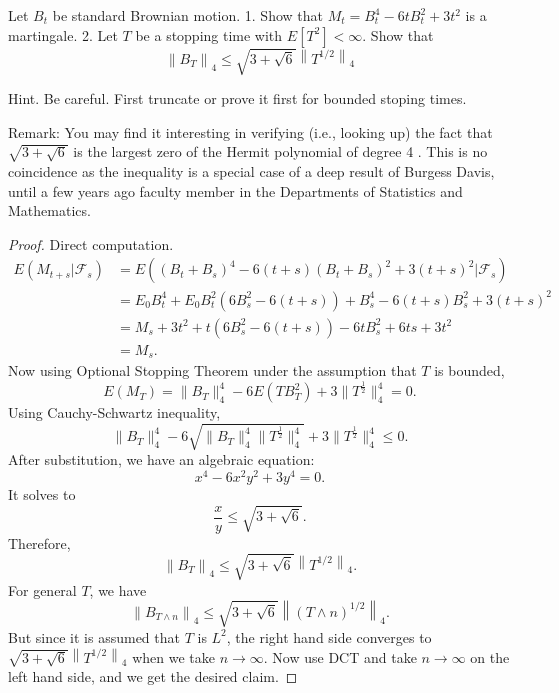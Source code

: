 \begin{problem}
	Let $B_t$ be standard Brownian motion.
1. Show that $M_t=B_t^4-6 t B_t^2+3 t^2$ is a martingale.
2. Let $T$ be a stopping time with $E\left[T^2\right]<\infty$. Show that
\[
\left\|B_T\right\|_4 \leq \sqrt{3+\sqrt{6}}\left\|T^{1 / 2}\right\|_4
\]

Hint. Be careful. First truncate or prove it first for bounded stoping times.

Remark: You may find it interesting in verifying (i.e., looking up) the fact that $\sqrt{3+\sqrt{6}}$ is the largest zero of the Hermit polynomial of degree 4 . This is no coincidence as the inequality is a special case of a deep result of Burgess Davis, until a few years ago faculty member in the Departments of Statistics and Mathematics.
\end{problem}
\begin{proof}
	Direct computation.
	\begin{align*}
		E(M_{t + s} | \mathcal{F}_s)
		&= E\left( (B_t + B_s)^4 - 6 (t + s)(B_t + B_s)^2 + 3(t + s)^2 | \mathcal{F}_s \right)  \\
		&= E_0 B_t^4 + E_0 B_t^2 \left( 6 B_s^2 -6 (t + s) \right) + B_s^4 - 6(t + s) B_s^2 + 3(t + s)^2 \\
		&= M_s + 3 t^2 + t(6 B_s^2 - 6(t + s)) - 6 t B_s^2 + 6 t s + 3 t^2 \\
		&= M_s
	.\end{align*}
	Now using Optional Stopping Theorem under the assumption that $T$ is bounded,
	\[
		E(M_T) = \|B_T\|_4^4 - 6 E(T B_T^2) + 3 \|T^{\frac{1}{2}}\|_4^4 = 0
	.\] 
	Using Cauchy-Schwartz inequality,
\[
		\|B_T\|_4^4 - 6 \sqrt{\|B_T\|_4^4 \|T^{\frac{1}{2}}\|_4^4}  + 3 \|T^{\frac{1}{2}}\|_4^4 \le  0
	.\]
	After substitution, we have an algebraic equation:
	 \[
		x^4 - 6 x^2 y^2 + 3 y^4 = 0
	.\] 
	It solves to
	\[
		\frac{x}{y} \le \sqrt{3 + \sqrt{6} } 
	.\] 
	Therefore,
	\[
		\left\|B_T\right\|_4 \leq \sqrt{3+\sqrt{6}}\left\|T^{1 / 2}\right\|_4
	.\] 
	For general $T$, we have
\[
		\left\|B_{T \wedge n}\right\|_4 \leq \sqrt{3+\sqrt{6}}\left\|\left( T \wedge n \right) ^{1 / 2}\right\|_4
	.\]
	But since it is assumed that $T$ is $L^2$, the right hand side converges to $ \sqrt{3+\sqrt{6}}\left\|T^{1 / 2}\right\|_4$ when we take $n \to \infty $. Now use DCT and take $n \to \infty $ on the left hand side, and we get the desired claim.
\end{proof}


